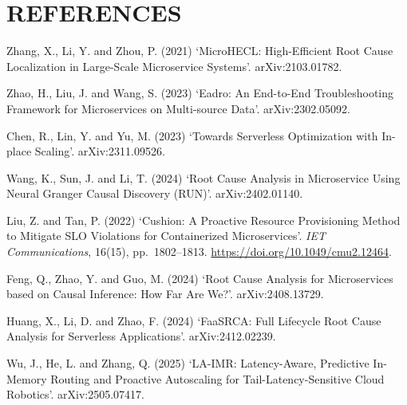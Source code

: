 
\chapter*{REFERENCES}
\renewcommand{\currentchapter}{REFERENCES}

\noindent
Zhang, X., Li, Y. and Zhou, P. (2021) `MicroHECL: High-Efficient Root Cause Localization in Large-Scale Microservice Systems'. arXiv:2103.01782.

\vspace{1em}

\noindent
Zhao, H., Liu, J. and Wang, S. (2023) `Eadro: An End-to-End Troubleshooting Framework for Microservices on Multi-source Data'. arXiv:2302.05092.

\vspace{1em}

\noindent
Chen, R., Lin, Y. and Yu, M. (2023) `Towards Serverless Optimization with In-place Scaling'. arXiv:2311.09526.

\vspace{1em}

\noindent
Wang, K., Sun, J. and Li, T. (2024) `Root Cause Analysis in Microservice Using Neural Granger Causal Discovery (RUN)'. arXiv:2402.01140.

\vspace{1em}

\noindent
Liu, Z. and Tan, P. (2022) `Cushion: A Proactive Resource Provisioning Method to Mitigate SLO Violations for Containerized Microservices'. \textit{IET Communications}, 16(15), pp.~1802--1813. \url{https://doi.org/10.1049/cmu2.12464}.

\vspace{1em}

\noindent
Feng, Q., Zhao, Y. and Guo, M. (2024) `Root Cause Analysis for Microservices based on Causal Inference: How Far Are We?'. arXiv:2408.13729.

\vspace{1em}

\noindent
Huang, X., Li, D. and Zhao, F. (2024) `FaaSRCA: Full Lifecycle Root Cause Analysis for Serverless Applications'. arXiv:2412.02239.

\vspace{1em}

\noindent
Wu, J., He, L. and Zhang, Q. (2025) `LA-IMR: Latency-Aware, Predictive In-Memory Routing and Proactive Autoscaling for Tail-Latency-Sensitive Cloud Robotics'. arXiv:2505.07417.

